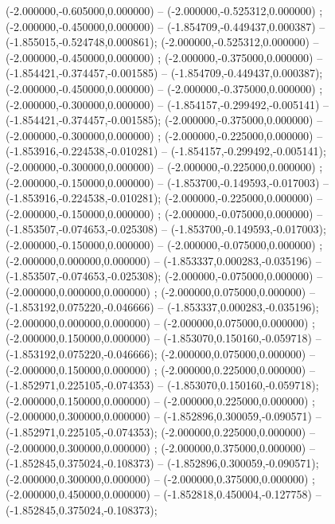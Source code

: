  (-2.000000,-0.605000,0.000000) -- (-2.000000,-0.525312,0.000000) ;
 (-2.000000,-0.450000,0.000000) -- (-1.854709,-0.449437,0.000387) -- (-1.855015,-0.524748,0.000861);
 (-2.000000,-0.525312,0.000000) -- (-2.000000,-0.450000,0.000000) ;
 (-2.000000,-0.375000,0.000000) -- (-1.854421,-0.374457,-0.001585) -- (-1.854709,-0.449437,0.000387);
 (-2.000000,-0.450000,0.000000) -- (-2.000000,-0.375000,0.000000) ;
 (-2.000000,-0.300000,0.000000) -- (-1.854157,-0.299492,-0.005141) -- (-1.854421,-0.374457,-0.001585);
 (-2.000000,-0.375000,0.000000) -- (-2.000000,-0.300000,0.000000) ;
 (-2.000000,-0.225000,0.000000) -- (-1.853916,-0.224538,-0.010281) -- (-1.854157,-0.299492,-0.005141);
 (-2.000000,-0.300000,0.000000) -- (-2.000000,-0.225000,0.000000) ;
 (-2.000000,-0.150000,0.000000) -- (-1.853700,-0.149593,-0.017003) -- (-1.853916,-0.224538,-0.010281);
 (-2.000000,-0.225000,0.000000) -- (-2.000000,-0.150000,0.000000) ;
 (-2.000000,-0.075000,0.000000) -- (-1.853507,-0.074653,-0.025308) -- (-1.853700,-0.149593,-0.017003);
 (-2.000000,-0.150000,0.000000) -- (-2.000000,-0.075000,0.000000) ;
 (-2.000000,0.000000,0.000000) -- (-1.853337,0.000283,-0.035196) -- (-1.853507,-0.074653,-0.025308);
 (-2.000000,-0.075000,0.000000) -- (-2.000000,0.000000,0.000000) ;
 (-2.000000,0.075000,0.000000) -- (-1.853192,0.075220,-0.046666) -- (-1.853337,0.000283,-0.035196);
 (-2.000000,0.000000,0.000000) -- (-2.000000,0.075000,0.000000) ;
 (-2.000000,0.150000,0.000000) -- (-1.853070,0.150160,-0.059718) -- (-1.853192,0.075220,-0.046666);
 (-2.000000,0.075000,0.000000) -- (-2.000000,0.150000,0.000000) ;
 (-2.000000,0.225000,0.000000) -- (-1.852971,0.225105,-0.074353) -- (-1.853070,0.150160,-0.059718);
 (-2.000000,0.150000,0.000000) -- (-2.000000,0.225000,0.000000) ;
 (-2.000000,0.300000,0.000000) -- (-1.852896,0.300059,-0.090571) -- (-1.852971,0.225105,-0.074353);
 (-2.000000,0.225000,0.000000) -- (-2.000000,0.300000,0.000000) ;
 (-2.000000,0.375000,0.000000) -- (-1.852845,0.375024,-0.108373) -- (-1.852896,0.300059,-0.090571);
 (-2.000000,0.300000,0.000000) -- (-2.000000,0.375000,0.000000) ;
 (-2.000000,0.450000,0.000000) -- (-1.852818,0.450004,-0.127758) -- (-1.852845,0.375024,-0.108373);
